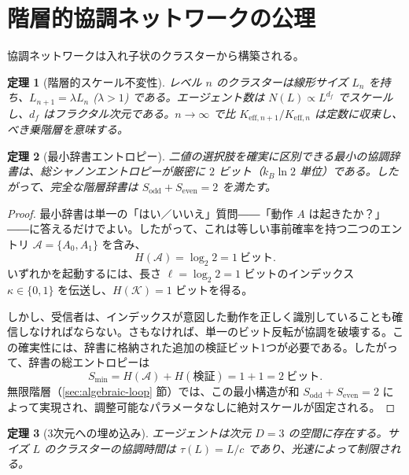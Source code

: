\documentclass[12pt,a4paper]{article}
\newtheorem{theorem}{定理}[section]
\begin{document}
	\section{階層的協調ネットワークの公理}
	
	協調ネットワークは入れ子状のクラスターから構築される。
	
	\begin{theorem}[階層的スケール不変性] \label{ax:A1}
		レベル \(n\) のクラスターは線形サイズ \(L_n\) を持ち、\(L_{n+1} = \lambda L_n\) (\(\lambda > 1\)) である。エージェント数は \(N(L) \propto L^{d_f}\) でスケールし、\(d_f\) はフラクタル次元である。\(n \to \infty\) で比 \(K_{\mathrm{eff},n+1}/K_{\mathrm{eff},n}\) は定数に収束し、べき乗階層を意味する。
	\end{theorem}
	
	\begin{theorem}[最小辞書エントロピー]
		\label{thm:minimal-dict}
		二値の選択肢を確実に区別できる最小の協調辞書は、総シャノンエントロピーが厳密に \(2\) ビット（\(k_B\ln 2\) 単位）である。したがって、完全な階層辞書は \(S_{\mathrm{odd}} + S_{\mathrm{even}} = 2\) を満たす。
	\end{theorem}
	
	\begin{proof}
		最小辞書は単一の「はい／いいえ」質問――「動作 \(A\) は起きたか？」――に答えるだけでよい。したがって、これは等しい事前確率を持つ二つのエントリ \(\mathcal{A} = \{A_0, A_1\}\) を含み、
		\[
		H(\mathcal{A}) = \log_2 2 = 1\ \text{ビット}.
		\]
		いずれかを起動するには、長さ \(\ell = \log_2 2 = 1\) ビットのインデックス \(\kappa \in \{0,1\}\) を伝送し、\(H(\mathcal{K}) = 1\) ビットを得る。
		
		しかし、受信者は、インデックスが意図した動作を正しく識別していることも確信しなければならない。さもなければ、単一のビット反転が協調を破壊する。この確実性には、辞書に格納された追加の検証ビット1つが必要である。したがって、辞書の総エントロピーは
		\[
		S_{\min} = H(\mathcal{A}) + H(\text{検証}) = 1 + 1 = 2\ \text{ビット}.
		\]
		無限階層（\ref{sec:algebraic-loop} 節）では、この最小構造が和 \(S_{\mathrm{odd}} + S_{\mathrm{even}} = 2\) によって実現され、調整可能なパラメータなしに絶対スケールが固定される。
	\end{proof}
	
	\begin{theorem}[3次元への埋め込み] \label{ax:A3}
		エージェントは次元 \(D = 3\) の空間に存在する。サイズ \(L\) のクラスターの協調時間は \(\tau(L) = L/c\) であり、光速によって制限される。
	\end{theorem}
	
\end{document}
